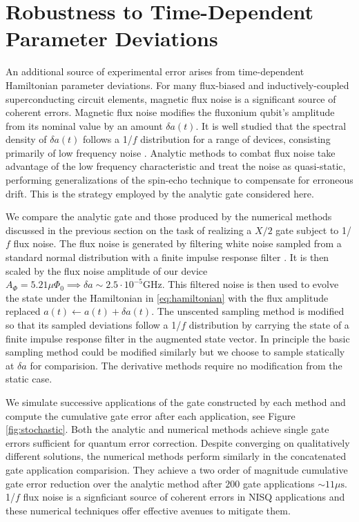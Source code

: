\section{Robustness to Time-Dependent Parameter Deviations \label{sec:stochastic}}
An additional source of experimental error arises from time-dependent
Hamiltonian parameter deviations. For many flux-biased and inductively-coupled
superconducting circuit elements, magnetic flux noise is a significant
source of coherent errors. Magnetic flux noise
modifies the fluxonium qubit's amplitude from its nominal value by an amount $\delta a(t)$.
It is well studied that the spectral density of $\delta a(t)$ follows a
1/$f$ distribution for a range of devices, consisting primarily of low frequency
noise . Analytic methods to combat flux noise
take advantage of the low frequency characteristic and
treat the noise as quasi-static, performing generalizations of the spin-echo technique
to compensate for erroneous drift. This is the strategy employed by the analytic gate
considered here.

We compare the analytic gate and those produced by
the numerical methods discussed in the previous section
on the task of realizing a $X/2$ gate subject to 1/$f$ flux noise.
The flux noise is generated by
filtering white noise sampled from a standard normal distribution with a finite
impulse response filter \cite{saspweb2011}.
It is then scaled by the 
flux noise amplitude of our device $A_{\Phi} = 5.21 \mu \Phi_{0} \implies
\delta a \sim 2.5 \cdot 10^{-5} \textrm{GHz}$. This filtered noise
is then used to evolve the state under the Hamiltonian in \eqref{eq:hamiltonian}
with the flux amplitude replaced $a(t) \gets a(t) + \delta a(t)$.
The unscented sampling method is modified so that its sampled deviations
follow a 1/$f$ distribution by carrying the state of a finite impulse response filter
in the augmented state vector. In principle the basic sampling method could be modified
similarly but we choose to sample statically at $\delta a$ for comparision. The derivative
methods require no modification from the static case.

We simulate successive applications of the gate constructed by each method
and compute the cumulative gate error
after each application, see Figure \ref{fig:stochastic}. Both the analytic
and numerical methods achieve single gate errors
sufficient for quantum error correction. Despite converging on qualitatively different solutions, the
numerical methods perform similarly in the concatenated gate application comparision. They achieve a two
order of magnitude cumulative gate error reduction over the analytic method after $200$
gate applications $\sim 11 \mu\textrm{s}$.
1/$f$ flux noise is a signficiant source of coherent errors in NISQ applications and
these numerical techniques offer effective avenues to mitigate them.
